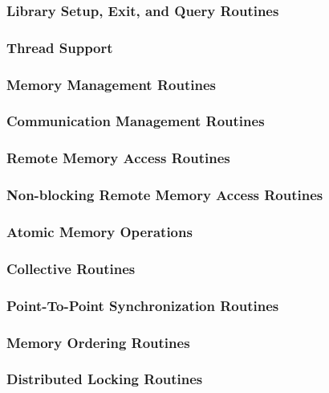 \subsubsection{Library Setup, Exit, and Query Routines}
\label{subsubsec:ftn_setup}

\subsubsection{Thread Support}
\label{subsubsec:ftn_thread}

\subsubsection{Memory Management Routines}
\label{subsubsec:ftn_mem_manage}

\subsubsection{Communication Management Routines}
\label{subsubsec:ftn_comm_manage}

\subsubsection{Remote Memory Access Routines}
\label{subsubsec:ftn_rma}

\subsubsection{Non-blocking Remote Memory Access Routines}
\label{subsubsec:ftn_rma_nbi}

\subsubsection{Atomic Memory Operations}
\label{subsubsec:ftn_amo}

\subsubsection{Collective Routines}
\label{subsubsec:ftn_coll}

\subsubsection{Point-To-Point Synchronization Routines}
\label{subsubsec:ftn_ptp_sync}

\subsubsection{Memory Ordering Routines}
\label{subsubsec:ftn_mem_order}

\subsubsection{Distributed Locking Routines}
\label{subsubsec:ftn_locks}

